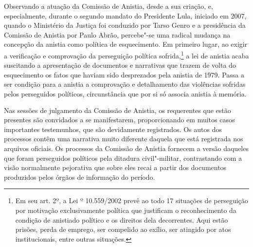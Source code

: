 Observando a atuação da Comissão de Anistia, desde a sua criação, e,
especialmente, durante o segundo mandato do Presidente Lula, iniciado em
2007, quando o Ministério da Justiça foi conduzido por Tarso Genro e a
presidência da Comissão de Anistia por Paulo Abrão, percebe"-se uma
radical mudança na concepção da anistia como política de esquecimento.
Em primeiro lugar, ao exigir a verificação e comprovação da perseguição
política sofrida,\footnote{Em seu art. 2º, a Lei º 10.559/2002 prevê ao
  todo 17 situações de perseguição por motivação exclusivamente política
  que justificam o reconhecimento da condição de anistiado político e os
  direitos dela decorrentes. Aqui estão prisões, perda de emprego, ser
  compelido ao exílio, ser atingido por atos institucionais, entre
  outras situações.} a lei de anistia acaba suscitando a apresentação
de documentos e narrativas que trazem de volta do esquecimento os fatos
que haviam sido desprezados pela anistia de 1979. Passa a ser condição
para a anistia a comprovação e detalhamento das violências sofridas
pelos perseguidos políticos, circunstância que por si só associa anistia
à memória.

Nas sessões de julgamento da Comissão de Anistia, os requerentes que
estão presentes são convidados a se manifestarem, proporcionando em
muitos casos importantes testemunhos, que são devidamente registrados.
Os autos dos processos contêm uma narrativa muito diferente daquela que
está registrada nos arquivos oficiais. Os processos da Comissão de
Anistia fornecem a versão daqueles que foram perseguidos políticos pela
ditadura civil"-militar, contrastando com a visão normalmente pejorativa
que sobre eles recai a partir dos documentos produzidos pelos órgãos de
informação do período.


